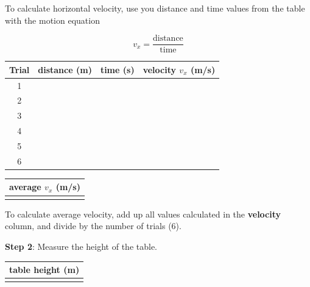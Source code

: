 \documentclass[../main-physics-problems.tex]{subfiles}
\begin{document}
\noindent To calculate horizontal velocity, use you distance and time values from the table with the motion equation

\begin{equation*}
    v_x = \frac{\text{distance}}{\text{time}}
\end{equation*}

\bigskip

\begin{minipage}{0.6\textwidth}
\begin{center}
\def\arraystretch{1.5}
    \begin{tabular}{|c|c|c|c|}
        \hline
        \textbf{Trial} & \textbf{distance} (m) & \textbf{time} (s) & \textbf{velocity} $v_x$ (m/s)\\ \hline
        1 & & & \\ \hline
        2 & & & \\ \hline
        3 & & & \\ \hline
        4 & & & \\ \hline
        5 & & & \\ \hline
        6 & & & \\ \hline
    \end{tabular}
\end{center}
\end{minipage}%
\begin{minipage}{0.35\textwidth}
    \begin{center}
\def\arraystretch{1.5}
        \begin{tabular}{|c|}
            \hline
             \textbf{average} $v_x$ (m/s)\\
             \hline \\[1em]
             \hline
        \end{tabular}
    \end{center}    
\end{minipage}

\bigskip

\noindent To calculate average velocity, add up all values calculated in the \textbf{velocity} column, and divide by the number of trials (6).


\clearpage

\noindent \textbf{Step 2}: Measure the height of the table.

\begin{center}
    \begin{tabular}{|c|}
        \hline
         \textbf{table height} (m)\\
         \hline \\[1em]
         \hline
    \end{tabular}
\end{center}
\end{document}
